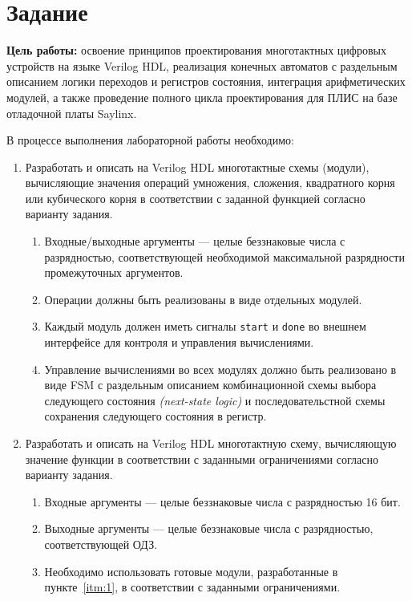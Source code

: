 \section{Задание}

\textbf{Цель работы:} освоение принципов проектирования многотактных цифровых устройств на языке Verilog HDL, реализация конечных автоматов с раздельным описанием логики переходов и регистров состояния, интеграция арифметических модулей, а также проведение полного цикла проектирования для ПЛИС на базе отладочной платы Saylinx.

В процессе выполнения лабораторной работы необходимо:
\begin{enumerate}
    \item\label{itm:1} Разработать и описать на Verilog HDL многотактные схемы (модули), вычисляющие значения операций умножения, сложения, квадратного корня или кубического корня в соответствии с заданной функцией согласно варианту задания.
    \begin{enumerate}
        \item Входные/выходные аргументы --- целые беззнаковые числа с разрядностью, соответствующей необходимой максимальной разрядности промежуточных аргументов.
        \item Операции должны быть реализованы в виде отдельных модулей.
        \item Каждый модуль должен иметь сигналы \texttt{start} и \texttt{done} во внешнем интерфейсе для контроля и управления вычислениями.
        \item Управление вычислениями во всех модулях должно быть реализовано в виде FSM с раздельным описанием комбинационной схемы выбора следующего состояния \textit{(next-state logic)} и последовательстной схемы сохранения следующего состояния в регистр.
    \end{enumerate}
    \item Разработать и описать на Verilog HDL многотактную схему, вычисляющую значение функции в соответствии с заданными ограничениями согласно варианту задания.
        \begin{enumerate}
            \item Входные аргументы --- целые беззнаковые числа с разрядностью 16 бит.
            \item Выходные аргументы --- целые беззнаковые числа с разрядностью, соответствующей ОДЗ.
            \item Необходимо использовать готовые модули, разработанные в пункте~\ref{itm:1}, в соответствии с заданными ограничениями.

\end{enumerate}
\end{enumerate}
